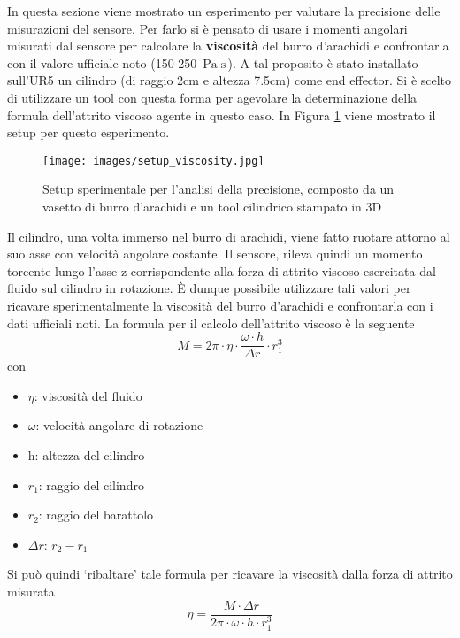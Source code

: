 In questa sezione viene mostrato un esperimento per valutare la precisione delle misurazioni del sensore\footnotemark{}. 
Per farlo si \`{e} pensato di usare i momenti angolari misurati dal sensore per calcolare la \textbf{viscosit\`{a}} del burro 
d'arachidi e confrontarla con il valore ufficiale noto (150-250 $\text{Pa} \cdot \text{s}$). 
A tal proposito \`{e} stato installato sull'UR5 un cilindro (di raggio 2cm e altezza 7.5cm) come end effector. 
Si \`{e} scelto di utilizzare un tool con questa forma per agevolare la determinazione della formula dell'attrito viscoso agente 
in questo caso.
In Figura \ref{fig:peanut_butter} viene mostrato il setup per questo esperimento. 
\newpage
\begin{figure}[H]
    \centering
    \texttt{[image: images/setup\_viscosity.jpg]}
    \caption{Setup sperimentale per l'analisi della precisione, composto da un vasetto di burro d'arachidi e un tool 
    cilindrico stampato in 3D}
    \label{fig:peanut_butter}
\end{figure}
Il cilindro, una volta immerso nel burro di arachidi, viene fatto ruotare attorno al suo asse con velocit\`{a} angolare 
costante. Il sensore, rileva quindi un momento torcente lungo l'asse z corrispondente alla forza di attrito viscoso esercitata 
dal fluido sul cilindro in rotazione. \`{E} dunque possibile utilizzare tali valori per ricavare sperimentalmente 
la viscosit\`{a} del burro d'arachidi e confrontarla con i dati ufficiali noti. 
La formula per il calcolo dell'attrito viscoso \`{e} la seguente 
\begin{equation*}
    M = 2\pi \cdot \eta \cdot \frac{\omega \cdot h}{\Delta r} \cdot r_{1}^{3}
\end{equation*}
con 
\begin{itemize}
    \item $\eta$: viscosit\`{a} del fluido
    \item $\omega$: velocit\`{a} angolare di rotazione
    \item h: altezza del cilindro
    \item $r_{1}$: raggio del cilindro
    \item $r_{2}$: raggio del barattolo
    \item $\Delta r$: $r_{2} - r_{1}$
\end{itemize}
Si pu\`{o} quindi `ribaltare' tale formula per ricavare la viscosit\`{a} dalla forza di attrito misurata 
\begin{equation} \label{eq:eta}
    \eta = \frac{M \cdot \Delta r}{2\pi \cdot \omega \cdot h \cdot r_{1}^{3}}
\end{equation}
